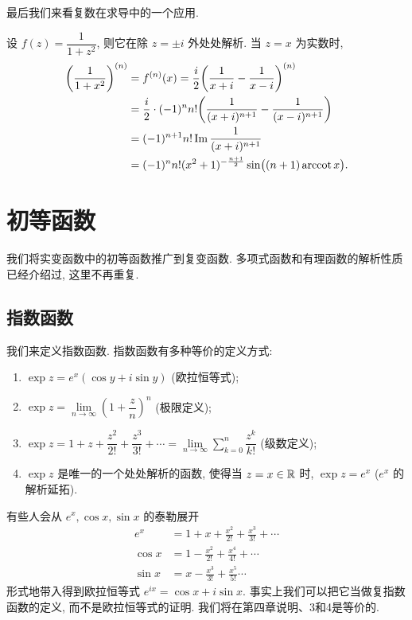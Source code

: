 最后我们来看复数在求导中的一个应用.

\begin{example}
	设 $f(z)=\dfrac1{1+z^2}$, 则它在除 $z=\pm i$ 外处处解析.
	当 $z=x$ 为实数时,
  \begin{align*}
    \biggl(\frac1{1+x^2}\biggr)^{(n)}&
      =f^{(n)}(x)=\frac i2\biggl(\frac1{x+i}-\frac1{x-i}\biggr)^{(n)}\\
    &=\frac i2\cdot(-1)^n n!\biggl(\frac1{(x+i)^{n+1}}-\frac1{(x-i)^{n+1}}\biggr)\\
    &=(-1)^{n+1}n!\operatorname{Im}\frac1{(x+i)^{n+1}}\\
    &=(-1)^nn!(x^2+1)^{-\frac{n+1}2}\sin\bigl((n+1)\operatorname{arccot} x\bigr).
  \end{align*}
\end{example}


\section{初等函数}

我们将实变函数中的初等函数推广到复变函数.
多项式函数和有理函数的解析性质已经介绍过, 这里不再重复.

\subsection{指数函数}

我们来定义指数函数. 
指数函数有多种等价的定义方式:
\begin{enumerate}
	\item $\exp z=e^x(\cos y+i\sin y)$ (欧拉恒等式);
	\item $\exp z=\lim\limits_{n\to\infty}\left(1+\dfrac zn\right)^n$ (极限定义);
	\item $\exp z=1+z+\dfrac{z^2}{2!}+\dfrac{z^3}{3!}+\cdots
	=\lim\limits_{n\to\infty}\sum\limits_{k=0}^n\dfrac{z^k}{k!}$ (级数定义);
	\item $\exp z$ 是唯一的一个处处解析的函数, 使得当 $z=x\in{\mathbb{R}}$ 时, $\exp z=e^x$ ($e^x$ 的解析延拓).
\end{enumerate}

有些人会从 $e^x,\cos x,\sin x$ 的泰勒展开
\begin{align*}
	e^x&=1+x+\frac{x^2}{2!}+\frac{x^3}{3!}+\cdots\\
	\cos x&=1-\frac{x^2}{2!}+\frac{x^4}{4!}+\cdots\\
	\sin x&=x-\frac{x^3}{3!}+\frac{x^5}{5!}\cdots
\end{align*}
形式地带入得到欧拉恒等式 $e^{ix}=\cos x+i\sin x$.
事实上我们可以把它当做复指数函数的定义, 而不是欧拉恒等式的证明.
我们将在第四章说明、\enumnum3和\enumnum4是等价的.

